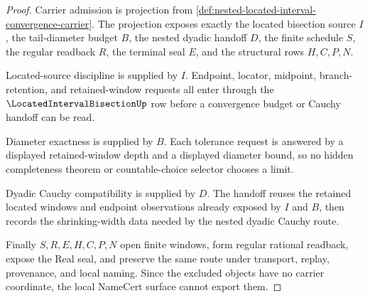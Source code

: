 \begin{proof}
Carrier admission is projection from \autoref{def:nested-located-interval-convergence-carrier}. The projection exposes exactly the located bisection source $I$, the tail-diameter budget $B$, the nested dyadic handoff $D$, the finite schedule $S$, the regular readback $R$, the terminal seal $E$, and the structural rows $H,C,P,N$.

Located-source discipline is supplied by $I$. Endpoint, locator, midpoint, branch-retention, and retained-window requests all enter through the $\LocatedIntervalBisectionUp$ row before a convergence budget or Cauchy handoff can be read.

Diameter exactness is supplied by $B$. Each tolerance request is answered by a displayed retained-window depth and a displayed diameter bound, so no hidden completeness theorem or countable-choice selector chooses a limit.

Dyadic Cauchy compatibility is supplied by $D$. The handoff reuses the retained located windows and endpoint observations already exposed by $I$ and $B$, then records the shrinking-width data needed by the nested dyadic Cauchy route.

Finally $S,R,E,H,C,P,N$ open finite windows, form regular rational readback, expose the Real seal, and preserve the same route under transport, replay, provenance, and local naming. Since the excluded objects have no carrier coordinate, the local NameCert surface cannot export them.
\end{proof}

